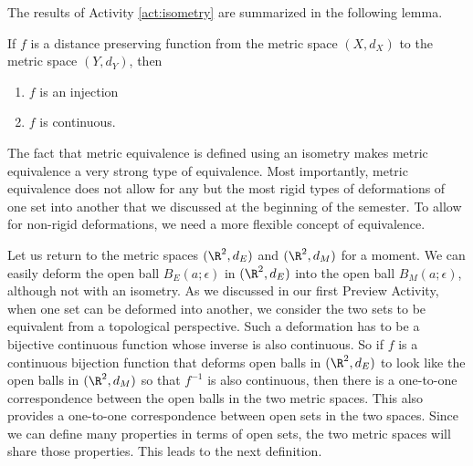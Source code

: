 The results of Activity \ref{act:isometry} are summarized in the following lemma.



\begin{lemma} If $f$ is a distance preserving function from the metric space $(X,d_X)$ to the metric space $(Y,d_Y)$, then 
\begin{enumerate}
\item $f$ is an injection
\item $f$ is continuous.
\end{enumerate}
\end{lemma}


\begin{comment}
\begin{proof} Let $f$ be an isometry from the metric space $(X,d_X)$ to the metric space $(Y,d_Y)$. We first prove that $f$ is an injection. Let $a_1, a_2 \in X$ and assume $f(a_1) = f(a_2)$. Then 
\[0 = d_Y(f(a_1),f(a_2)) = d_X(a_1,a_2),\]
which implies $a=b$. Thus, $f$ is an injection.

Now we prove that $f$ is continuous. Let $a \in X$, and let $\epsilon > 0$ be given. Let $\delta = \epsilon$. If $x \in X$ so that $d_X(x,a) < \delta$, then
\[d_Y(f(x), f(a)) = d_X(x,a) < \delta = \epsilon.\]
Therefore, $f$ is a continuous function from $X$ to $Y$. 
\end{proof}
\end{comment}


 
The fact that metric equivalence is defined using an isometry makes metric equivalence a very strong type of equivalence. Most importantly, metric equivalence does not allow for any but the most rigid types of deformations of one set into another that we discussed at the beginning of the semester. To allow for non-rigid deformations, we need a more flexible concept of equivalence. 

Let us return to the metric spaces $(\R^2, d_E)$ and $(\R^2, d_M)$ for a moment. We can easily deform the open ball $B_E(a; \epsilon)$ in $(\R^2, d_E)$ into the open ball $B_M(a; \epsilon)$, although not with an isometry. As we discussed in our first Preview Activity, when one set can be deformed into another, we consider the two sets to be equivalent from a topological perspective. Such a deformation has to be a bijective continuous function whose inverse is also continuous. So if $f$ is a continuous bijection function that deforms open balls in $(\R^2, d_E)$ to look like the open balls in $(\R^2, d_M)$ so that $f^{-1}$ is also continuous, then there is a one-to-one correspondence between the open balls in the two metric spaces. This also provides a one-to-one correspondence between open sets in the two spaces. Since we can define many properties in terms of open sets, the two metric spaces will share those properties. This leads to the next definition.



